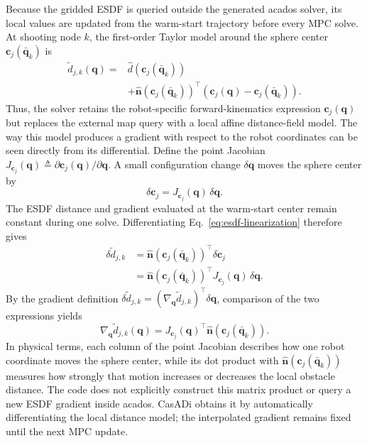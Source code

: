 \documentclass[conference]{IEEEtran}
\newcommand{\vect}[1]{\boldsymbol{#1}}
\begin{document}
Because the gridded ESDF is queried outside the generated acados solver, its
local values are updated from the warm-start trajectory before every MPC
solve.  At shooting node $k$, the first-order Taylor model around the sphere
center $\vect{c}_j(\bar{\vect{q}}_k)$ is
\begin{equation}
\begin{aligned}
\widetilde d_{j,k}(\vect{q})={}&
\widehat d\!\left(\vect{c}_j(\bar{\vect{q}}_k)\right)\\
&+\widehat{\vect{n}}\!\left(\vect{c}_j(\bar{\vect{q}}_k)\right)^{\top}
\left(\vect{c}_j(\vect{q})-\vect{c}_j(\bar{\vect{q}}_k)\right).
\end{aligned}
\label{eq:esdf-linearization}
\end{equation}
Thus, the solver retains the robot-specific forward-kinematics expression
$\vect{c}_j(\vect{q})$ but replaces the external map query with a local affine
distance-field model.  The way this model produces a gradient with respect to
the robot coordinates can be seen directly from its differential.  Define the
point Jacobian
$J_{\vect{c}_j}(\vect{q})\triangleq
\partial\vect{c}_j(\vect{q})/\partial\vect{q}$.  A small configuration change
$\delta\vect{q}$ moves the sphere center by
\begin{equation}
\delta\vect{c}_j=J_{\vect{c}_j}(\vect{q})\,\delta\vect{q}.
\end{equation}
The ESDF distance and gradient evaluated at the warm-start center remain
constant during one solve.  Differentiating Eq.~\eqref{eq:esdf-linearization}
therefore gives
\begin{equation}
\begin{aligned}
\delta\widetilde d_{j,k}
&=\widehat{\vect{n}}\!\left(\vect{c}_j(\bar{\vect{q}}_k)\right)^{\top}
  \delta\vect{c}_j\\
&=\widehat{\vect{n}}\!\left(\vect{c}_j(\bar{\vect{q}}_k)\right)^{\top}
  J_{\vect{c}_j}(\vect{q})\,\delta\vect{q}.
\end{aligned}
\end{equation}
By the gradient definition
$\delta\widetilde d_{j,k}=(\nabla_{\vect{q}}\widetilde
d_{j,k})^{\top}\delta\vect{q}$, comparison of the two expressions yields
\begin{equation}
\nabla_{\vect{q}}\widetilde d_{j,k}(\vect{q})
=J_{\vect{c}_j}(\vect{q})^{\top}
 \widehat{\vect{n}}\!\left(\vect{c}_j(\bar{\vect{q}}_k)\right).
\label{eq:linearized-esdf-gradient}
\end{equation}
In physical terms, each column of the point Jacobian describes how one robot
coordinate moves the sphere center, while its dot product with
$\widehat{\vect{n}}(\vect{c}_j(\bar{\vect{q}}_k))$ measures how strongly that
motion increases or decreases the local obstacle distance.  The code does not
explicitly construct this matrix product or query a new ESDF gradient inside
acados.  CasADi obtains it by automatically differentiating the local distance
model; the interpolated gradient remains fixed until the next MPC update.
\end{document}
